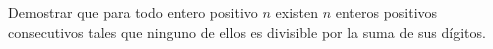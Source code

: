 Demostrar que para todo entero positivo $n$ existen $n$ enteros positivos consecutivos tales que ninguno de ellos es divisible por la suma de sus dígitos.
